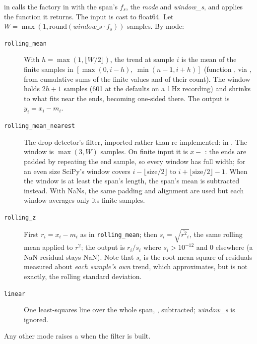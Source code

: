  in  calls the factory
 in  with the span's $f_s$, the
\emph{mode} and \emph{window\_s}, and applies the function it returns. The input is cast to
float64. Let $W = \max(1, \mathrm{round}(\mathit{window\_s}\cdot f_s))$ samples. By mode:
\begin{description}
\item[\texttt{rolling\_mean}] With $h = \max(1, \lfloor W/2 \rfloor)$, the trend at sample $i$
  is the mean of the finite samples in $[\max(0, i-h),\ \min(n-1, i+h)]$ (function
  , via , from cumulative sums of the finite
  values and of their count). The window holds $2h+1$ samples (601 at the defaults on a 1\,Hz
  recording) and shrinks to what fits near the ends, becoming one-sided there. The output is
  $y_i = x_i - m_i$.
\item[\texttt{rolling\_mean\_nearest}] The drop detector's filter, imported rather than
  re-implemented:  in . The window
  is $\max(3, W)$ samples. On finite input it is $x -$
  : the ends are padded by
  repeating the end sample, so every window has full width; for an even size SciPy's window
  covers $i - \lfloor\mathrm{size}/2\rfloor$ to $i + \lfloor\mathrm{size}/2\rfloor - 1$. When
  the window is at least the span's length, the span's mean is subtracted instead. With NaNs, the
  same padding and alignment are used but each window averages only its finite samples.
\item[\texttt{rolling\_z}] First $r_i = x_i - m_i$ as in \texttt{rolling\_mean}; then
  $s_i = \sqrt{\overline{r^2}_i}$, the same rolling mean applied to $r^2$; the output is
  $r_i / s_i$ where $s_i > 10^{-12}$ and 0 elsewhere (a NaN residual stays NaN). Note that
  $s_i$ is the root mean square of residuals measured about \emph{each sample's own} trend,
  which approximates, but is not exactly, the rolling standard deviation.
\item[\texttt{linear}] One least-squares line over the whole span,
  , subtracted; \emph{window\_s} is ignored.
\end{description}
Any other mode raises a  when the filter is built.

